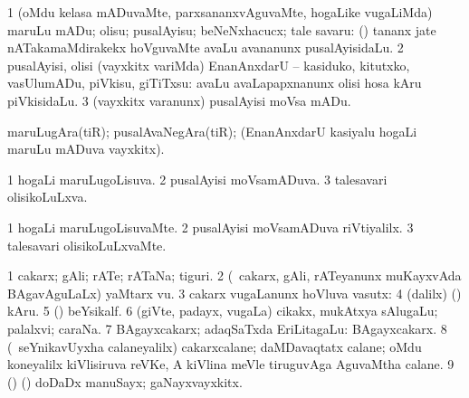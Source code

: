 \bentry
{} 
\gl{\sakirx}
\expl{}
\bmng
\bnum
\num{1} (oMdu kelasa mADuvaMte, parxsananxvAguvaMte, hogaLike \mo vugaLiMda) maruLu mADu; olisu; pusalAyisu; beNeNxhacucx; tale savaru:  (\AmA) tananx jate nATakamaMdirakekx hoVguvaMte avaLu avananunx pusalAyisidaLu. 
\num{2} pusalAyisi, olisi (vayxkitx \mo variMda) EnanAnxdarU -- kasiduko, kitutxko, vasUlumADu, piVkisu, giTiTxsu:  avaLu avaLapapxnanunx olisi hosa kAru piVkisidaLu. 
\num{3} (vayxkitx \mo varanunx) pusalAyisi moVsa mADu. 
\enum
\emng
\eentry

\bentry
{} 
\gl{\nA}
\expl{}
\bmng
maruLugAra(tiR); pusalAvaNegAra(tiR); (EnanAnxdarU kasiyalu hogaLi maruLu mADuva vayxkitx). 
\emng
\eentry

\bentry
{} 
\gl{\gu}
\expl{}
\bmng
\bnum
\num{1} hogaLi maruLugoLisuva. 
\num{2} pusalAyisi moVsamADuva. 
\num{3} talesavari olisikoLuLxva. 
\enum
\emng
\eentry

\bentry
{} 
\gl{\kirxvi}
\expl{}
\bmng
\bnum
\num{1} hogaLi maruLugoLisuvaMte. 
\num{2} pusalAyisi moVsamADuva riVtiyalilx. 
\num{3} talesavari olisikoLuLxvaMte. 
\enum
\emng
\eentry

\bentry
{} 
\gl{\nA}
\expl{}
\bmng
\bnum
\num{1} cakarx; gAli; rATe; rATaNa; tiguri. 
\num{2} (\kanmu\ cakarx, gAli, rATeyanunx muKayxvAda BAgavAguLaLx) yaMtarx \mo vu. 
\num{3} cakarx \mo vugaLanunx hoVluva vasutx:  
\num{4} (\bava dalilx) (\ashi) kAru. 
\num{5} (\ame) beYsikalf. 
\num{6} (giVte, padayx, \mo vugaLa) cikakx, mukAtxya sAlugaLu; palalxvi; caraNa. 
\num{7} BAgayxcakarx; adaqSaTxda EriLitagaLu:  BAgayxcakarx. 
\num{8} (\sA\ seYnikavUyxha calaneyalilx) cakarxcalane; daMDavaqtatx calane; oMdu koneyalilx kiVlisiruva reVKe, A kiVlina meVle tiruguvAga AguvaMtha calane. 
\num{9} (\ame) (\ashi) doDaDx manuSayx; gaNayxvayxkitx. 
\enum
\emng

